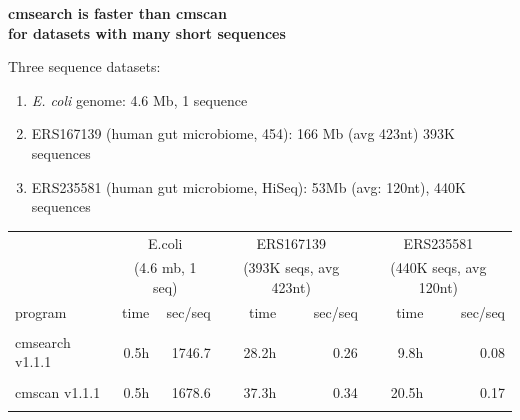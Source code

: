 \documentclass[landscape]{slides}
\begin{document}
\begin{slide}
\begin{center}
\textbf{cmsearch is faster than cmscan \\ for datasets with many short sequences}
\end{center}
\medskip

\small

Three sequence datasets:
\begin{enumerate}
  \item \emph{E. coli} genome: 4.6 Mb, 1 sequence
  \item ERS167139 (human gut microbiome, 454): 166 Mb (avg 423nt) 393K sequences 
  \item ERS235581 (human gut microbiome, HiSeq): 53Mb (avg: 120nt), 440K sequences
\end{enumerate}

\begin{center}

\medskip
\medskip

\begin{tabular}{l|r|r||r|r||r|r||}
         & \multicolumn{2}{c||}{E.coli}  & \multicolumn{2}{c||}{ERS167139} & \multicolumn{2}{c||}{ERS235581} \\
         & \multicolumn{2}{c||}{(4.6 mb, 1 seq)}  & \multicolumn{2}{c||}{(393K seqs, avg 423nt)} & \multicolumn{2}{c||}{(440K seqs, avg 120nt)} \\ \hline
program  & time & sec/seq & time & sec/seq & time & sec/seq \\ \hline
         &      &  & & & & \\
cmsearch v1.1.1  &     0.5h& 1746.7  & 28.2h   & 0.26    & 9.8h    & 0.08 \\
         &      &  & & & & \\
cmscan v1.1.1   &     0.5h& 1678.6  & 37.3h   & 0.34    & 20.5h   & 0.17 \\
         &      &  & & & & \\ 
\end{tabular}

\end{center}
\vfill
\end{slide}
\end{document}

